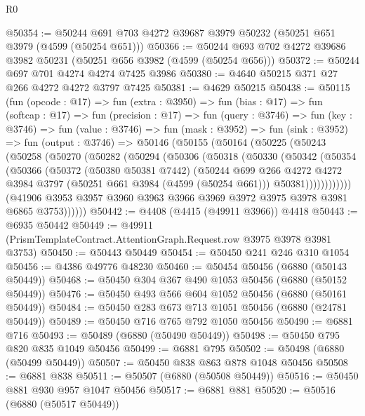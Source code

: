 \begin{lexlean}{R0}
\begin{coremodule}
@50354 := @50244 @691 @703 @4272 @39687 @3979 @50232 (@50251 @651 @3979 (@4599 (@50254 @651)))
@50366 := @50244 @693 @702 @4272 @39686 @3982 @50231 (@50251 @656 @3982 (@4599 (@50254 @656)))
@50372 := @50244 @697 @701 @4274 @4274 @7425 @3986
@50380 := @4640 @50215 @371 @27 @266 @4272 @4272 @3797 @7425
@50381 := @4629 @50215
@50438 := @50115
    (fun (opcode : @17) =>
    fun (extra : @3950) =>
    fun (bias : @17) =>
    fun (softcap : @17) =>
    fun (precision : @17) =>
    fun (query : @3746) =>
    fun (key : @3746) =>
    fun (value : @3746) =>
    fun (mask : @3952) =>
    fun (sink : @3952) =>
    fun (output : @3746) =>
    @50146
      (@50155
        (@50164
          (@50225
            (@50243
              (@50258
                (@50270
                  (@50282
                    (@50294
                      (@50306
                        (@50318
                          (@50330
                            (@50342
                              (@50354
                                (@50366
                                  (@50372
                                    (@50380 @50381 @7442)
                                    (@50244
                                      @699
                                      @266
                                      @4272
                                      @4272
                                      @3984
                                      @3797
                                      (@50251 @661 @3984 (@4599 (@50254 @661)))
                                      @50381))))))))))))
              (@41906 @3953 @3957 @3960 @3963 @3966 @3969 @3972 @3975 @3978 @3981 @6865 @3753))))))
@50442 := @4408 (@4415 (@49911 @3966)) @4418
@50443 := @6935 @50442
@50449 := @49911 (PrismTemplateContract.AttentionGraph.Request.row @3975 @3978 @3981 @3753)
@50450 := @50443 @50449
@50454 := @50450 @241 @246 @310 @1054
@50456 := @4386 @49776 @48230
@50460 := @50454 @50456 (@6880 (@50143 @50449))
@50468 := @50450 @304 @367 @490 @1053 @50456 (@6880 (@50152 @50449))
@50476 := @50450 @493 @566 @604 @1052 @50456 (@6880 (@50161 @50449))
@50484 := @50450 @283 @673 @713 @1051 @50456 (@6880 (@24781 @50449))
@50489 := @50450 @716 @765 @792 @1050 @50456
@50490 := @6881 @716
@50493 := @50489 (@6880 (@50490 @50449))
@50498 := @50450 @795 @820 @835 @1049 @50456
@50499 := @6881 @795
@50502 := @50498 (@6880 (@50499 @50449))
@50507 := @50450 @838 @863 @878 @1048 @50456
@50508 := @6881 @838
@50511 := @50507 (@6880 (@50508 @50449))
@50516 := @50450 @881 @930 @957 @1047 @50456
@50517 := @6881 @881
@50520 := @50516 (@6880 (@50517 @50449))

\end{coremodule}
\end{lexlean}
